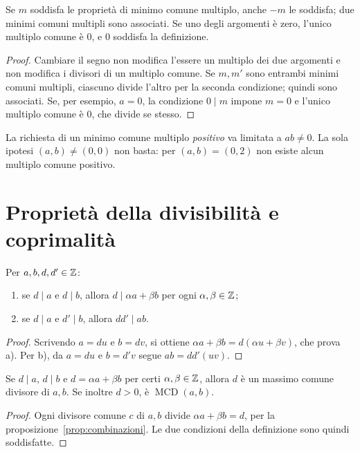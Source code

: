 \begin{proposizione}
Se $m$ soddisfa le proprietà di minimo comune multiplo, anche $-m$ le soddisfa; due minimi comuni multipli sono associati. Se uno degli argomenti è zero, l'unico multiplo comune è $0$, e $0$ soddisfa la definizione.
\end{proposizione}
\begin{proof}
Cambiare il segno non modifica l'essere un multiplo dei due argomenti e non modifica i divisori di un multiplo comune. Se $m,m'$ sono entrambi minimi comuni multipli, ciascuno divide l'altro per la seconda condizione; quindi sono associati. Se, per esempio, $a=0$, la condizione $0\mid m$ impone $m=0$ e l'unico multiplo comune è $0$, che divide se stesso.
\end{proof}

\begin{osservazione}
La richiesta di un minimo comune multiplo \emph{positivo} va limitata a $ab\ne0$. La sola ipotesi $(a,b)\ne(0,0)$ non basta: per $(a,b)=(0,2)$ non esiste alcun multiplo comune positivo.
\end{osservazione}

\section{Proprietà della divisibilità e coprimalità}
\begin{proposizione}\label{prop:combinazioni}
Per $a,b,d,d'\in\mathbb{Z}$:
\begin{enumerate}[label=\alph*)]
  \item se $d\mid a$ e $d\mid b$, allora $d\mid\alpha a+\beta b$ per ogni $\alpha,\beta\in\mathbb{Z}$;
  \item se $d\mid a$ e $d'\mid b$, allora $dd'\mid ab$.
\end{enumerate}
\end{proposizione}
\begin{proof}
Scrivendo $a=du$ e $b=dv$, si ottiene $\alpha a+\beta b=d(\alpha u+\beta v)$, che prova a). Per b), da $a=du$ e $b=d'v$ segue $ab=dd'(uv)$.
\end{proof}

\begin{proposizione}\label{prop:criterio-mcd}
Se $d\mid a$, $d\mid b$ e $d=\alpha a+\beta b$ per certi $\alpha,\beta\in\mathbb{Z}$, allora $d$ è un massimo comune divisore di $a,b$. Se inoltre $d>0$, è $\operatorname{MCD}(a,b)$.
\end{proposizione}
\begin{proof}
Ogni divisore comune $c$ di $a,b$ divide $\alpha a+\beta b=d$, per la proposizione~\ref{prop:combinazioni}. Le due condizioni della definizione sono quindi soddisfatte.
\end{proof}

